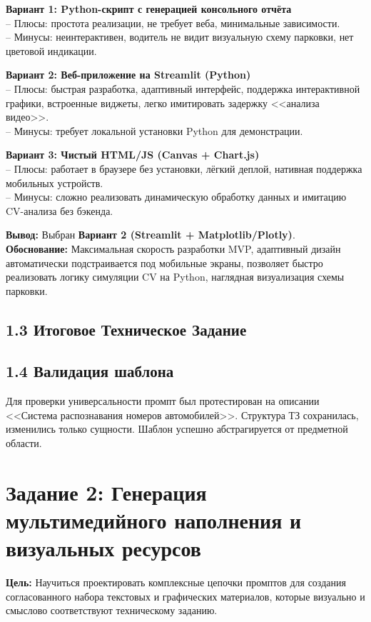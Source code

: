 \documentclass[oneside,a4paper,14pt]{extarticle}
\begin{document}
\noindent
\textbf{Вариант 1: Python-скрипт с генерацией консольного отчёта}\\
-- Плюсы: простота реализации, не требует веба, минимальные зависимости.\\
-- Минусы: неинтерактивен, водитель не видит визуальную схему парковки, нет цветовой индикации.

\noindent
\textbf{Вариант 2: Веб-приложение на Streamlit (Python)}\\
-- Плюсы: быстрая разработка, адаптивный интерфейс, поддержка интерактивной графики, встроенные виджеты, легко имитировать задержку <<анализа видео>>.\\
-- Минусы: требует локальной установки Python для демонстрации.

\noindent
\textbf{Вариант 3: Чистый HTML/JS (Canvas + Chart.js)}\\
-- Плюсы: работает в браузере без установки, лёгкий деплой, нативная поддержка мобильных устройств.\\
-- Минусы: сложно реализовать динамическую обработку данных и имитацию CV-анализа без бэкенда.

\noindent
\textbf{Вывод:} Выбран \textbf{Вариант 2 (Streamlit + Matplotlib/Plotly)}.\\
\textbf{Обоснование:} Максимальная скорость разработки MVP, адаптивный дизайн автоматически подстраивается под мобильные экраны, позволяет быстро реализовать логику симуляции CV на Python, наглядная визуализация схемы парковки.

\newpage
\subsection*{1.3 Итоговое Техническое Задание}


\subsection*{1.4 Валидация шаблона}
\noindent
Для проверки универсальности промпт был протестирован на описании <<Система распознавания номеров автомобилей>>. Структура ТЗ сохранилась, изменились только сущности. Шаблон успешно абстрагируется от предметной области.

\section*{Задание 2: Генерация мультимедийного наполнения и визуальных ресурсов}
\noindent
\textbf{Цель:} Научиться проектировать комплексные цепочки промптов для создания согласованного набора текстовых и графических материалов, которые визуально и смыслово соответствуют техническому заданию.
\end{document}
